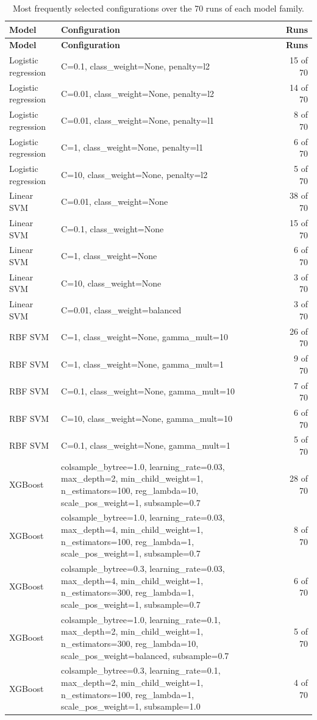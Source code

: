 \documentclass[10pt,a4paper]{article}
\begin{document}
\begin{center}\tiny\renewcommand{\arraystretch}{1.12}
\begin{longtable}{lp{11.5cm}r}
\caption{Most frequently selected configurations over the 70 runs of each model family.}\\
\toprule
\textbf{Model} & \textbf{Configuration} & \textbf{Runs}\\\midrule\endfirsthead
\toprule
\textbf{Model} & \textbf{Configuration} & \textbf{Runs}\\\midrule\endhead
\bottomrule\endfoot
Logistic regression & C=0.1, class\_weight=None, penalty=l2 & 15 of 70\\
Logistic regression & C=0.01, class\_weight=None, penalty=l2 & 14 of 70\\
Logistic regression & C=0.01, class\_weight=None, penalty=l1 & 8 of 70\\
Logistic regression & C=1, class\_weight=None, penalty=l1 & 6 of 70\\
Logistic regression & C=10, class\_weight=None, penalty=l2 & 5 of 70\\
Linear SVM & C=0.01, class\_weight=None & 38 of 70\\
Linear SVM & C=0.1, class\_weight=None & 15 of 70\\
Linear SVM & C=1, class\_weight=None & 6 of 70\\
Linear SVM & C=10, class\_weight=None & 3 of 70\\
Linear SVM & C=0.01, class\_weight=balanced & 3 of 70\\
RBF SVM & C=1, class\_weight=None, gamma\_mult=10 & 26 of 70\\
RBF SVM & C=1, class\_weight=None, gamma\_mult=1 & 9 of 70\\
RBF SVM & C=0.1, class\_weight=None, gamma\_mult=10 & 7 of 70\\
RBF SVM & C=10, class\_weight=None, gamma\_mult=10 & 6 of 70\\
RBF SVM & C=0.1, class\_weight=None, gamma\_mult=1 & 5 of 70\\
XGBoost & colsample\_bytree=1.0, learning\_rate=0.03, max\_depth=2, min\_child\_weight=1, n\_estimators=100, reg\_lambda=10, scale\_pos\_weight=1, subsample=0.7 & 28 of 70\\
XGBoost & colsample\_bytree=1.0, learning\_rate=0.03, max\_depth=4, min\_child\_weight=1, n\_estimators=100, reg\_lambda=1, scale\_pos\_weight=1, subsample=0.7 & 8 of 70\\
XGBoost & colsample\_bytree=0.3, learning\_rate=0.03, max\_depth=4, min\_child\_weight=1, n\_estimators=300, reg\_lambda=1, scale\_pos\_weight=1, subsample=0.7 & 6 of 70\\
XGBoost & colsample\_bytree=1.0, learning\_rate=0.1, max\_depth=2, min\_child\_weight=1, n\_estimators=300, reg\_lambda=10, scale\_pos\_weight=balanced, subsample=0.7 & 5 of 70\\
XGBoost & colsample\_bytree=0.3, learning\_rate=0.1, max\_depth=2, min\_child\_weight=1, n\_estimators=100, reg\_lambda=1, scale\_pos\_weight=1, subsample=1.0 & 4 of 70\\
\end{longtable}\end{center}
\end{document}
